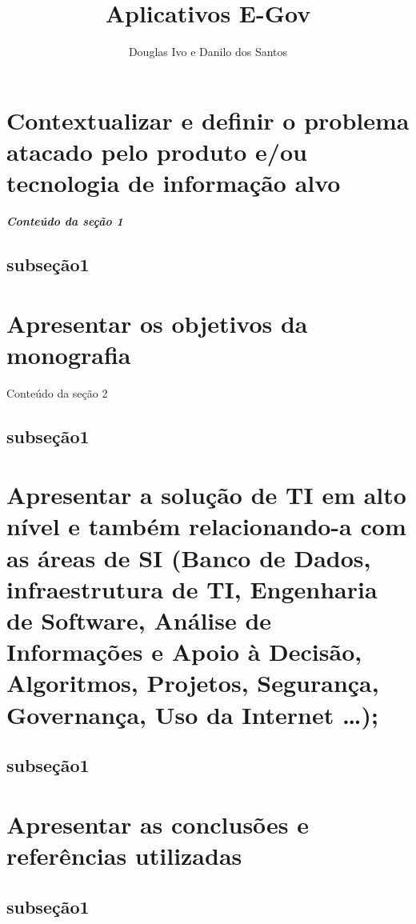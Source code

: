 \documentclass{article}
\begin{document}
\title{Aplicativos E-Gov}
\author{Douglas Ivo e Danilo dos Santos}

\maketitle
\pagebreak
\tableofcontents
\pagebreak

\section{Contextualizar e definir o problema atacado pelo produto e/ou tecnologia de informação alvo}
\textit{\textbf{Conteúdo da seção 1}}
\subsection{subseção1}

\section{Apresentar os objetivos da monografia}
Conteúdo da seção 2
\subsection{subseção1}

\section{Apresentar a solução de TI em alto nível e também relacionando-a com as áreas de SI (Banco de Dados, infraestrutura de TI, Engenharia de Software, Análise de Informações e Apoio à Decisão, Algoritmos, Projetos, Segurança, Governança, Uso da Internet …);}
\subsection{subseção1}

\section{Apresentar as conclusões e referências utilizadas}
\subsection{subseção1}
\end{document}

